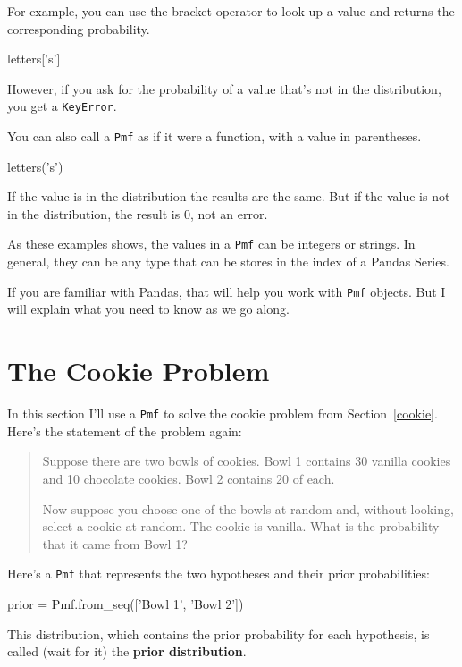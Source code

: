 \documentclass[12pt]{book}
\theoremstyle{exercise}
\newcommand{\py}[1]{{\tt #1}}%
\begin{document}
For example, you can use the bracket operator to look up a value and returns the corresponding probability.

\begin{code}
letters['s']
\end{code}

However, if you ask for the probability of a value that's not in the distribution, you get a \py{KeyError}.

You can also call a \py{Pmf} as if it were a function, with a value in parentheses.

\begin{code}
letters('s')
\end{code}

If the value is in the distribution the results are the same.
But if the value is not in the distribution, the result is $0$, not an error.

As these examples shows, the values in a \py{Pmf} can be integers or strings.
In general, they can be any type that can be stores in the index of a Pandas Series.

If you are familiar with Pandas, that will help you work with \py{Pmf} objects.
But I will explain what you need to know as we go along.


\section{The Cookie Problem}

In this section I'll use a \py{Pmf} to solve the cookie problem from Section~\ref{cookie}.
Here's the statement of the problem again:

\begin{quote}
Suppose there are two bowls of cookies.
Bowl 1 contains 30 vanilla cookies and 10 chocolate cookies.
Bowl 2 contains 20 of each.

Now suppose you choose one of the bowls at random and, without
looking, select a cookie at random.  The cookie is vanilla.  What is
the probability that it came from Bowl 1?
\end{quote}


Here's a \py{Pmf} that represents the two hypotheses and their prior probabilities:

\begin{code}
prior = Pmf.from_seq(['Bowl 1', 'Bowl 2'])

\end{code}

This distribution, which contains the prior probability for each hypothesis,
is called (wait for it) the {\bf prior distribution}.
\end{document}

